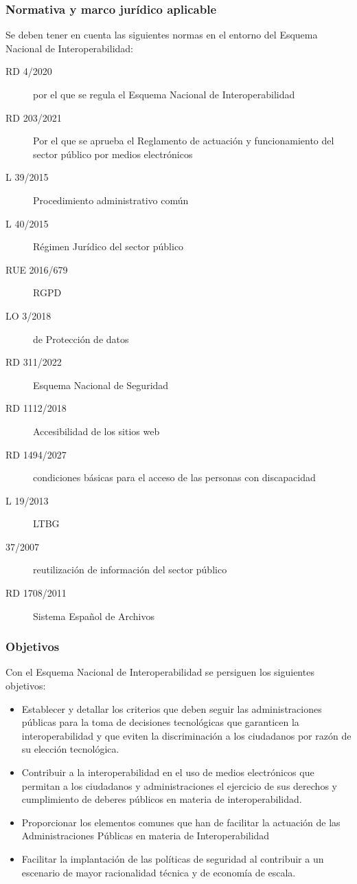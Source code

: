     \subsubsection{Normativa y marco jurídico aplicable} %
        Se deben tener en cuenta las siguientes normas en el entorno del Esquema Nacional de Interoperabilidad:
        \begin{description}
            \item[RD 4/2020] por el que se regula el Esquema Nacional de Interoperabilidad
            \item[RD 203/2021] Por el que se aprueba el Reglamento de actuación y funcionamiento del sector público por medios electrónicos
            \item[L 39/2015] Procedimiento administrativo común
            \item[L 40/2015] Régimen Jurídico del sector público
            \item[RUE 2016/679] RGPD
            \item[LO 3/2018] de Protección de datos
            \item[RD 311/2022] Esquema Nacional de Seguridad
            \item[RD 1112/2018] Accesibilidad de los sitios web
            \item[RD 1494/2027] condiciones básicas para el acceso de las personas con discapacidad
            \item[L 19/2013] LTBG
            \item[37/2007] reutilización de información del sector público
            \item[RD 1708/2011] Sistema Español de Archivos
        \end{description}

    \subsubsection{Objetivos} %
        Con el Esquema Nacional de Interoperabilidad se persiguen los siguientes objetivos:
        \begin{itemize}
            \item Establecer y detallar los criterios que deben seguir las administraciones públicas para la toma de decisiones tecnológicas que garanticen la interoperabilidad y que eviten la discriminación a los ciudadanos por razón de su elección tecnológica.
            \item Contribuir a la interoperabilidad en el uso de medios electrónicos que permitan a los ciudadanos y administraciones el ejercicio de sus derechos y cumplimiento de deberes públicos en materia de interoperabilidad.
            \item Proporcionar los elementos comunes que han de facilitar la actuación de las Administraciones Públicas en materia de Interoperabilidad
            \item Facilitar la implantación de las políticas de seguridad al contribuir a  un escenario de mayor racionalidad técnica y de economía de escala.
        \end{itemize}

